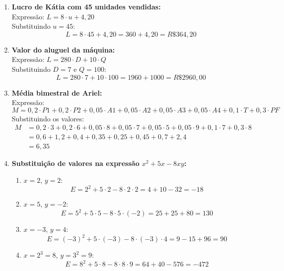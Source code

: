 \documentclass[a4paper]{article}
\begin{document}
	\begin{enumerate}
		\item \textbf{Lucro de Kátia com 45 unidades vendidas:} \\
		Expressão: $L = 8 \cdot u + 4{,}20$ \\
		Substituindo $u = 45$:
		\[
		L = 8 \cdot 45 + 4{,}20 = 360 + 4{,}20 = \boxed{R\$ 364{,}20}
		\]
		
		\item \textbf{Valor do aluguel da máquina:} \\
		Expressão: $L = 280 \cdot D + 10 \cdot Q$ \\
		Substituindo $D = 7$ e $Q = 100$:
		\[
		L = 280 \cdot 7 + 10 \cdot 100 = 1960 + 1000 = \boxed{R\$ 2960{,}00}
		\]
		
		\item \textbf{Média bimestral de Ariel:} \\
		Expressão:
		\[
		M = 0{,}2 \cdot P1 + 0{,}2 \cdot P2 + 0{,}05 \cdot A1 + 0{,}05 \cdot A2 + 0{,}05 \cdot A3 + 0{,}05 \cdot A4 + 0{,}1 \cdot T + 0{,}3 \cdot PF
		\]
		Substituindo os valores:
		\begin{align*}
			M &= 0{,}2 \cdot 3 + 0{,}2 \cdot 6 + 0{,}05 \cdot 8 + 0{,}05 \cdot 7 + 0{,}05 \cdot 5 + 0{,}05 \cdot 9 + 0{,}1 \cdot 7 + 0{,}3 \cdot 8 \\
			&= 0{,}6 + 1{,}2 + 0{,}4 + 0{,}35 + 0{,}25 + 0{,}45 + 0{,}7 + 2{,}4 \\
			&= \boxed{6{,}35}
		\end{align*}
		
		\item \textbf{Substituição de valores na expressão $x^2 + 5x - 8xy$:}
		\begin{multicols}{2}
			\begin{enumerate}[label=\alph*)]
				\item $x = 2$, $y = 2$:
				\[
				E = 2^2 + 5\cdot2 - 8\cdot2\cdot2 = 4 + 10 - 32 = \boxed{-18}
				\]
				\item $x = 5$, $y = -2$:
				\[
				E = 5^2 + 5\cdot5 - 8\cdot5\cdot(-2) = 25 + 25 + 80 = \boxed{130}
				\]
				\item $x = -3$, $y = 4$:
				\[
				E = (-3)^2 + 5\cdot(-3) - 8\cdot(-3)\cdot4 = 9 - 15 + 96 = \boxed{90}
				\]
				\item $x = 2^3 = 8$, $y = 3^2 = 9$:
				\[
				E = 8^2 + 5\cdot8 - 8\cdot8\cdot9 = 64 + 40 - 576 = \boxed{-472}
				\]
			\end{enumerate}
		\end{multicols}
		

\end{enumerate}
\end{document}
